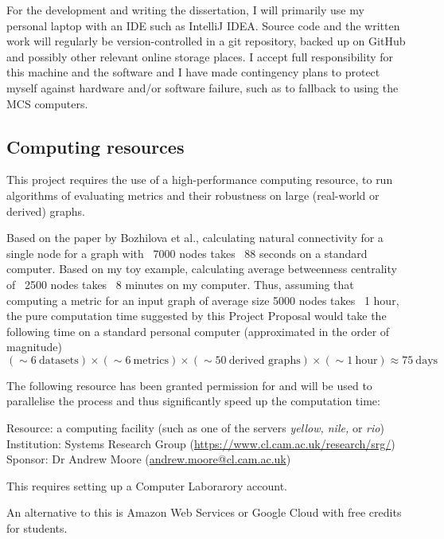 \documentclass[12pt,a4paper,twoside]{article}
\begin{document}
    For the development and writing the dissertation, I will primarily use my personal laptop with an IDE such as IntelliJ IDEA. Source code and the written work will regularly be version-controlled in a git repository, backed up on GitHub and possibly other relevant online storage places. I accept full responsibility for this machine and the software and I have made contingency plans to protect myself against hardware and/or software failure, such as to fallback to using the MCS computers.

    \subsection*{Computing resources}

    This project requires the use of a high-performance computing resource, to run algorithms of evaluating metrics and their robustness on large (real-world or derived) graphs.
    
    Based on the paper by Bozhilova et al., calculating natural connectivity for a single node for a graph with ~7000 nodes takes ~88 seconds on a standard computer. Based on my toy example, calculating average betweenness centrality of ~2500 nodes takes ~8 minutes on my computer. Thus, assuming that computing a metric for an input graph of average size 5000 nodes takes ~1 hour, the pure computation time suggested by this Project Proposal would take the following time on a standard personal computer (approximated in the order of magnitude)
    $$(\sim 6\ \text{datasets}) \times (\sim 6\ \text{metrics}) \times (\sim 50\ \text{derived graphs}) \times (\sim 1\ \text{hour}) \approx 75\ \text{days}$$
    
    The following resource has been granted permission for and will be used to parallelise the process and thus significantly speed up the computation time:
    
    \begin{adjustwidth}{1cm}{}
    	Resource: a computing facility (such as one of the servers \textit{yellow, nile,} or \textit{rio})\\
    	Institution: Systems Research Group (\url{https://www.cl.cam.ac.uk/research/srg/})\\
    	Sponsor: Dr Andrew Moore (\url{andrew.moore@cl.cam.ac.uk})
    	
    	This requires setting up a Computer Laborarory account.
	\end{adjustwidth}
    
    An alternative to this is Amazon Web Services or Google Cloud with free credits for students.
    
\end{document}

